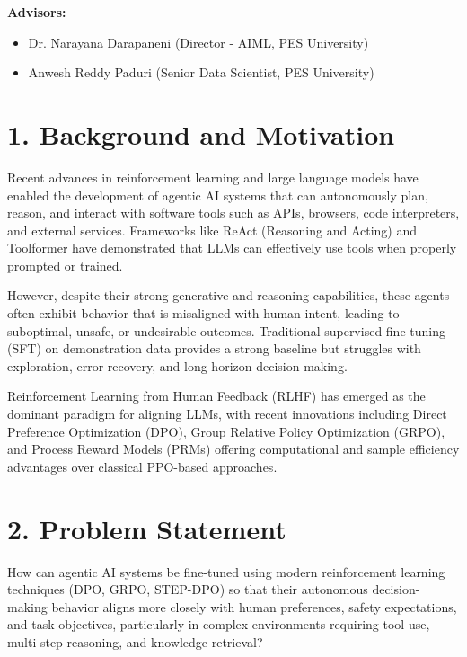 \documentclass[12pt,a4paper]{report}
\theoremstyle{definition}
\begin{document}
\noindent\textbf{Advisors:}
\begin{itemize}
    \item Dr. Narayana Darapaneni (Director - AIML, PES University)
    \item Anwesh Reddy Paduri (Senior Data Scientist, PES University)
\end{itemize}

\vspace{0.5cm}

\section*{1. Background and Motivation}

Recent advances in reinforcement learning and large language models have enabled the development of agentic AI systems that can autonomously plan, reason, and interact with software tools such as APIs, browsers, code interpreters, and external services. Frameworks like ReAct (Reasoning and Acting) and Toolformer have demonstrated that LLMs can effectively use tools when properly prompted or trained.

However, despite their strong generative and reasoning capabilities, these agents often exhibit behavior that is misaligned with human intent, leading to suboptimal, unsafe, or undesirable outcomes. Traditional supervised fine-tuning (SFT) on demonstration data provides a strong baseline but struggles with exploration, error recovery, and long-horizon decision-making.

Reinforcement Learning from Human Feedback (RLHF) has emerged as the dominant paradigm for aligning LLMs, with recent innovations including Direct Preference Optimization (DPO), Group Relative Policy Optimization (GRPO), and Process Reward Models (PRMs) offering computational and sample efficiency advantages over classical PPO-based approaches.

\section*{2. Problem Statement}

How can agentic AI systems be fine-tuned using modern reinforcement learning techniques (DPO, GRPO, STEP-DPO) so that their autonomous decision-making behavior aligns more closely with human preferences, safety expectations, and task objectives, particularly in complex environments requiring tool use, multi-step reasoning, and knowledge retrieval?
\end{document}
